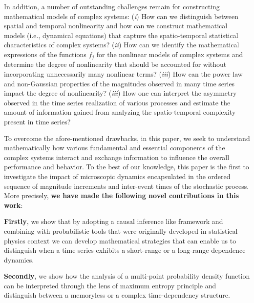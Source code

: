 In addition, a number of outstanding challenges remain for constructing mathematical models of complex systems: (\textit{i}) How can we distinguish between spatial and temporal nonlinearity and how can we construct mathematical models (i.e., dynamical equations) that capture the spatio-temporal statistical characteristics of complex systems? (\textit{ii}) How can we identify the mathematical expressions of the functions $f_{j}$ for the nonlinear models of complex systems and determine the degree of nonlinearity that should be accounted for without incorporating unnecessarily many nonlinear terms? (\textit{iii}) How can the power law and non-Gaussian properties of the magnitudes observed in many time series impact the degree of nonlinearity? (\textit{iii}) How one can interpret the asymmetry observed in the time series realization of various processes and estimate the amount of information gained from analyzing the spatio-temporal complexity present in time series?

 To overcome the afore-mentioned drawbacks, in this paper, we seek to understand mathematically how various fundamental and essential components of the complex systems interact and exchange information to influence the overall performance and behavior. To the best of our knowledge, this paper is the first to investigate the impact of microscopic dynamics encapsulated in the ordered sequence of magnitude increments and inter-event times of the stochastic process. More precisely, \textbf{we have made the following novel contributions in this work}:
 
 \textbf{Firstly}, we show that by adopting a causal inference like framework and combining with probabilistic tools that were originally developed in statistical physics context we can develop mathematical strategies that can enable us to distinguish when a time series exhibits a short-range or a long-range dependence dynamics. 
 
 \textbf{Secondly}, we show how the analysis of a multi-point probability density function can be interpreted through the lens of maximum entropy principle and distinguish between a memoryless or a complex time-dependency structure. 
 
